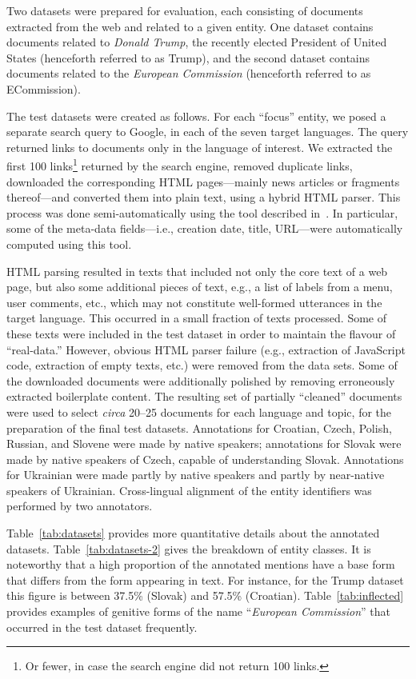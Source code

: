 \documentclass[11pt]{article}
\begin{document}
Two datasets were prepared for evaluation, each consisting of documents extracted from the web
and related to a given entity.  One dataset contains documents related to {\em Donald Trump}, the
recently elected President of United States (henceforth referred to as {\sc Trump}), and the
second dataset contains documents related to the {\em European Commission} (henceforth referred to
as {\sc ECommission}).

The test datasets were created as follows.  For each ``focus'' entity, we posed a separate
search query to Google, in each of the seven target languages.  The query returned links to
documents only in the language of interest.  We extracted the first 100 links\footnote{Or
  fewer, in case the search engine did not return 100 links.} returned by the search engine,
removed duplicate links, downloaded the corresponding HTML pages---mainly news articles or
fragments thereof---and converted them into plain text, using a hybrid HTML parser.  This
process was done semi-automatically using the tool described in~\cite{Crawley:ea:2010}.  In
particular, some of the meta-data fields---i.e., creation date, title, URL---were automatically
computed using this tool.

HTML parsing resulted in texts that included not only the core text of a web page, but also
some additional pieces of text, e.g., a list of labels from a menu, user comments, etc., which
may not constitute well-formed utterances in the target language.  This occurred in a small
fraction of texts processed.  Some of these texts were included in the test dataset in order
to maintain the flavour of ``real-data.''  However, obvious HTML parser failure (e.g.,
extraction of JavaScript code, extraction of empty texts, etc.) were removed from the data
sets.  Some of the downloaded documents were additionally polished by removing erroneously
extracted boilerplate content.  The resulting set of partially ``cleaned'' documents were used
to select {\em circa} 20--25 documents for each language and topic, for the preparation of the
final test datasets.  Annotations for Croatian, Czech, Polish, Russian, and Slovene were made
by native speakers; annotations for Slovak were made by native speakers of Czech, capable of
understanding Slovak.  Annotations for Ukrainian were made partly by native speakers and
partly by near-native speakers of Ukrainian.  Cross-lingual alignment of the entity
identifiers was performed by two annotators.



Table~\ref{tab:datasets} provides more quantitative details about the annotated datasets.
Table~\ref{tab:datasets-2} gives the breakdown of entity classes.  It is noteworthy that a
high proportion of the annotated mentions have a base form that differs from the form
appearing in text.  For instance, for the {\sc Trump} dataset this figure is between 37.5\%
(Slovak) and 57.5\% (Croatian). Table~\ref{tab:inflected} provides examples of genitive forms 
of the name ``\textit{European Commission}'' that occurred in the test dataset frequently.
\end{document}
